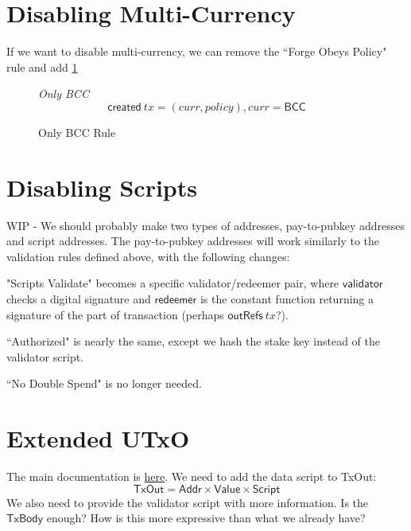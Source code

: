\documentclass[11pt,a4paper]{article}
\newcommand{\var}[1]{\mathit{#1}}
\newcommand{\fun}[1]{\mathsf{#1}}
\newcommand{\type}[1]{\mathsf{#1}}
\newcommand{\Script}{\type{Script}}
\newcommand{\Addr}{\type{Addr}}
\newcommand{\Value}{\type{Value}}
\newcommand{\TxOut}{\type{TxOut}}
\newcommand{\TxBody}{\type{TxBody}}
\newcommand{\created}[1]{\fun{created}\ \var{#1}}
\newcommand{\outRefs}[1]{\fun{outRefs}\ \var{#1}}
\begin{document}
\section{Disabling Multi-Currency}

If we want to disable multi-currency, we can remove the ``Forge Obeys Policy" rule and
add \cref{fig:only_bcc_rule}
\begin{figure}
\emph{Only BCC}
%
\begin{equation*}
\created tx = (curr, policy), curr = \mathsf{BCC}
\end{equation*}

\caption{Only BCC Rule}
\label{fig:only_bcc_rule}
\end{figure}


\section{Disabling Scripts}

WIP - We should probably make two types of addresses, pay-to-pubkey addresses and script addresses.
The pay-to-pubkey addresses will work similarly to the validation rules defined above, with the
following changes:

"Scripts Validate" becomes a specific validator/redeemer pair, where $\mathsf{validator}$ checks a
digital signature and $\mathsf{redeemer}$ is the constant function returning a signature of the
part of transaction (perhaps $\outRefs tx$?).

``Authorized" is nearly the same, except we hash the stake key instead of the validator script.

``No Double Spend" is no longer needed.

\section{Extended UTxO}

The main documentation is \href{https://github.com/The-Blockchain-Company/zerepoch/blob/master/extended-utxo-spec/extended-utxo-specification.tex}{here}.
We need to add the data script to TxOut:
$$ \TxOut = \Addr \times \Value \times \Script $$
We also need to provide the validator script with more information.  Is the $\TxBody$ enough?
How is this more expressive than what we already have?



\end{document}
